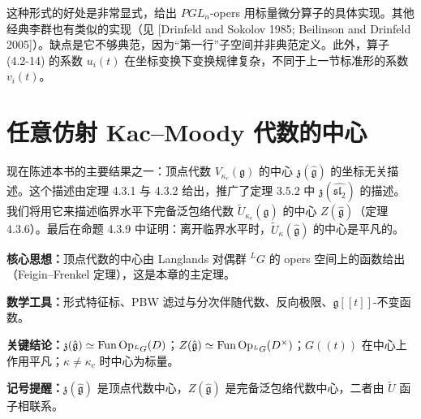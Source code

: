 这种形式的好处是非常显式，给出 $PGL_n$-opers 用标量微分算子的具体实现。其他经典李群也有类似的实现（见 [Drinfeld and Sokolov 1985; Beilinson and Drinfeld 2005]）。缺点是它不够典范，因为“第一行”子空间并非典范定义。此外，算子 (4.2-14) 的系数 $u_i(t)$ 在坐标变换下变换规律复杂，不同于上一节标准形的系数 $v_i(t)$。


\section{任意仿射 Kac--Moody 代数的中心}

现在陈述本书的主要结果之一：顶点代数 $V_{\kappa_c}(\mathfrak{g})$ 的中心 $\mathfrak{z}(\hat{\mathfrak{g}})$ 的坐标无关描述。这个描述由定理 4.3.1 与 4.3.2 给出，推广了定理 3.5.2 中 $\mathfrak{z}(\widehat{\mathfrak{sl}_2})$ 的描述。我们将用它来描述临界水平下完备泛包络代数 $\widetilde{U}_{\kappa_c}(\hat{\mathfrak{g}})$ 的中心 $Z(\hat{\mathfrak{g}})$（定理 4.3.6）。最后在命题 4.3.9 中证明：离开临界水平时，$\widetilde{U}_\kappa(\hat{\mathfrak{g}})$ 的中心是平凡的。

\begin{keypoints}
    \item \textbf{核心思想：}顶点代数的中心由 Langlands 对偶群 ${}^LG$ 的 opers 空间上的函数给出（Feigin–Frenkel 定理），这是本章的主定理。
    \item \textbf{数学工具：}形式特征标、PBW 滤过与分次伴随代数、反向极限、$\mathfrak{g}[[t]]$-不变函数。
    \item \textbf{关键结论：}$\mathfrak{z}(\hat{\mathfrak{g}})\simeq\operatorname{Fun}\operatorname{Op}_{{}^LG}(D)$；$Z(\hat{\mathfrak{g}})\simeq\operatorname{Fun}\operatorname{Op}_{{}^LG}(D^\times)$；$G((t))$ 在中心上作用平凡；$\kappa\ne\kappa_c$ 时中心为标量。
    \item \textbf{记号提醒：}$\mathfrak{z}(\hat{\mathfrak{g}})$ 是顶点代数中心，$Z(\hat{\mathfrak{g}})$ 是完备泛包络代数中心，二者由 $\widetilde{U}$ 函子相联系。
\end{keypoints}

